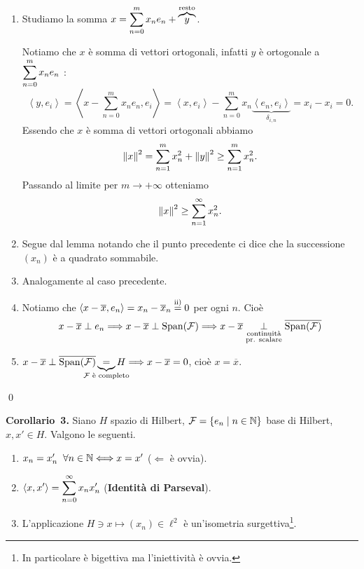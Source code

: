 \begin{enumerate}
\item Studiamo la somma $\displaystyle x = \sum_{n=0}^{m} x_n e_n + \overbrace{y}^{\text{resto}}$.

Notiamo che $x$ è somma di vettori ortogonali, infatti $y$ è ortogonale a $\displaystyle \sum_{n=0}^{m} x_n e_n$ :
%
$$
\left<y,e_i \right> = \left<x - \sum_{n=0}^{m} x_n e_n, e_i \right>
= \left<x,e_i \right> - \sum_{n=0}^{m} x_n \underbrace{\left<e_n,e_i \right>}_{\delta_{i,n}} = x_i - x_i = 0.
$$
%
Essendo che $x$ è somma di vettori ortogonali abbiamo
%
$$
\left\lVert x \right\rVert^2 = \sum_{n=1}^{m} x_n^2 + \left\lVert y \right\rVert^2 \geq \sum_{n=1}^{m} x_n^2.
$$
%
Passando al limite per $m \to +\infty$ otteniamo
%
$$
\left\lVert x \right\rVert^2 \geq \sum_{n=1}^{\infty} x_n^2. 
$$
%

\item Segue dal lemma notando che il punto precedente ci dice che la successione $(x_n)$ è a quadrato sommabile.

\item Analogamente al caso precedente.

\item Notiamo che $\left<x - \overline{x}, e_n \right> = x_n - \overline{x}_n \overset{\text{ii)}}{=} 0$ per ogni $n$. Cioè
%
$$
x - \overline{x} \perp e_n \Longrightarrow x - \overline{x} \perp \operatorname{Span}(\mathcal{F})
\Longrightarrow x - \overline{x} \underset{\substack{\text{continuità} \\ \text{pr. scalare}}}{\perp} \overline{\operatorname{Span}(\mathcal{F})}
$$
%

\item $x - \overline{x} \perp \overline{\spn(\mc{F})} \underbrace{=}_{\mathclap{\text{$\mc{F}$ è completo}}} H \Longrightarrow x - \overline{x} = 0$, cioè $x = \overline{x}$.
\end{enumerate}
\qed

\textbf{Corollario~3.} Siano $H$ spazio di Hilbert, $\mathcal{F} = \left\{ e_n \;\middle|\; n \in \mathbb N \right\}$ base di Hilbert, $x,x' \in H$. Valgono le seguenti.
\begin{enumerate}
\item $x_n = x_n' \;\; \forall n \in \mathbb N \Longleftrightarrow x = x'$ ($\Leftarrow$ è ovvia).

\item $\displaystyle \left<x,x' \right> = \sum_{n=0}^{\infty} x_n  x_n'$ (\textbf{Identità di Parseval}).

\item L'applicazione $H \ni x \mapsto (x_n) \in \ell^2$ è un'isometria surgettiva\footnote{In particolare è bigettiva ma l'iniettività è ovvia.}.
\end{enumerate}

